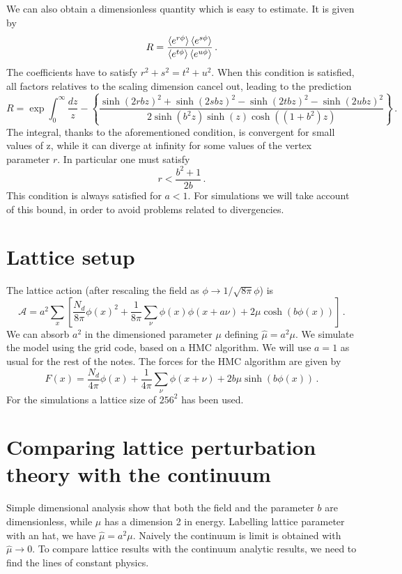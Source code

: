 \documentclass[12pt,a4paper]{report}
\begin{document}
We can also obtain a dimensionless quantity which is easy to estimate. It is given by \begin{equation}
R = \dfrac{\braket{e^{r\phi}} \braket{e^{s \phi}} }{ \braket{e^{t \phi}} \braket{e^{u \phi}} } \,.
\end{equation} The coefficients have to satisfy $r^2+s^2 = t^2 +u^2$. When this condition is satisfied, all factors relatives to the scaling dimension cancel out, leading to the prediction \begin{equation}
R =  \exp \int_0^\infty \dfrac{dz}{z} - \left\{ \dfrac{\sinh(2rbz)^2+ \sinh(2sbz)^2- \sinh(2tbz)^2- \sinh(2ubz)^2 }{2 \sinh(b^2 z) \sinh(z) \cosh((1+b^2)z) } \right\} \,.
\end{equation} The integral, thanks to the aforementioned condition, is convergent for small values of z, while it can diverge at infinity for some values of the vertex parameter $r$. In particular one must satisfy \begin{equation}
r < \dfrac{b^2+1}{2b} \,.
\end{equation} This condition is always satisfied for $a<1$. For simulations we will take account of this bound, in order to avoid problems related to divergencies.


\chapter{Lattice setup}
\label{sec:lattice_setup}
The lattice action (after rescaling the field as $\phi \to 1/\sqrt{8 \pi} \phi $) is \begin{equation}
\mathcal{A} = a^2 \sum_x \left[ \dfrac{N_d}{8 \pi} \phi(x)^2 + \dfrac{1}{8\pi} \sum_\nu \phi(x) \phi(x+ a \nu) +2  \mu \cosh(b\phi(x)) \right] \,.
\end{equation} We can absorb $a^2$ in the dimensioned parameter $\mu$ defining $\hat \mu = a^2 \mu$. We simulate the model using the grid code, based on a HMC algorithm. We will use $a=1$ as usual for the rest of the notes.
The forces for the HMC algorithm are given by \begin{equation}
F(x) = \dfrac{N_d}{4 \pi} \phi(x) + \dfrac{1}{4 \pi} \sum_{\nu}\phi(x+ \nu) + 2 b \mu \sinh(b\phi(x)) \,.
\end{equation} For the simulations a lattice size of $256^2$ has been used.

\chapter{Comparing lattice perturbation theory with the continuum }
\label{sec:lattice_pt}
Simple dimensional analysis show that both the field and the parameter $b$ are dimensionless, while $\mu$ has a dimension 2 in energy. Labelling lattice parameter with an hat, we have $\hat \mu = a^2 \mu$. Naively the continuum is limit is obtained  with $\hat \mu \to 0$. To compare lattice results with the continuum analytic results, we need to find the lines of constant physics.
\end{document}
